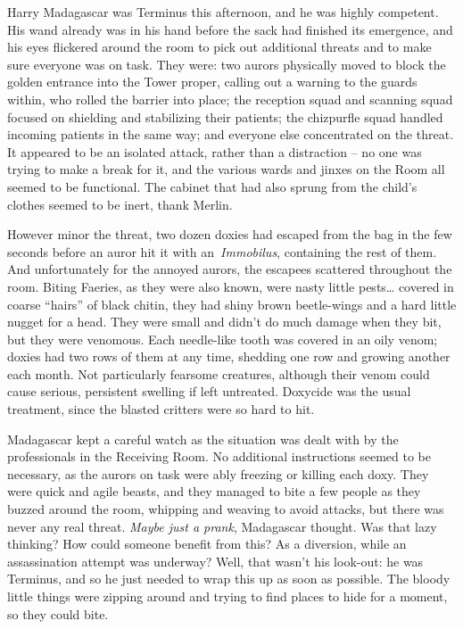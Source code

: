 Harry Madagascar was Terminus this afternoon, and he was highly
competent. His wand already was in his hand before the sack had finished
its emergence, and his eyes flickered around the room to pick out
additional threats and to make sure everyone was on task. They were: two
aurors physically moved to block the golden entrance into the Tower
proper, calling out a warning to the guards within, who rolled the
barrier into place; the reception squad and scanning squad focused on
shielding and stabilizing their patients; the chizpurfle squad handled
incoming patients in the same way; and everyone else concentrated on the
threat. It appeared to be an isolated attack, rather than a distraction
-- no one was trying to make a break for it, and the various wards and
jinxes on the Room all seemed to be functional. The cabinet that had
also sprung from the child's clothes seemed to be inert, thank Merlin.

However minor the threat, two dozen doxies had escaped from the bag in
the few seconds before an auror hit it with an~\emph{Immobilus},
containing the rest of them. And unfortunately for the annoyed aurors,
the escapees scattered throughout the room. Biting Faeries, as they were
also known, were nasty little pests\ldots{} covered in coarse ``hairs''
of black chitin, they had shiny brown beetle-wings and a hard little
nugget for a head. They were small and didn't do much damage when they
bit, but they were venomous. Each needle-like tooth was covered in an
oily venom; doxies had two rows of them at any time, shedding one row
and growing another each month. Not particularly fearsome creatures,
although their venom could cause serious, persistent swelling if left
untreated. Doxycide was the usual treatment, since the blasted critters
were so hard to hit.

Madagascar kept a careful watch as the situation was dealt with by the
professionals in the Receiving Room. No additional instructions seemed
to be necessary, as the aurors on task were ably freezing or killing
each doxy. They were quick and agile beasts, and they managed to bite a
few people as they buzzed around the room, whipping and weaving to avoid
attacks, but there was never any real threat. \emph{Maybe just a prank},
Madagascar thought. Was that lazy thinking? How could someone benefit
from this? As a diversion, while an assassination attempt was underway?
Well, that wasn't his look-out: he was Terminus, and so he just needed
to wrap this up as soon as possible. The bloody little things were
zipping around and trying to find places to hide for a moment, so they
could bite.

